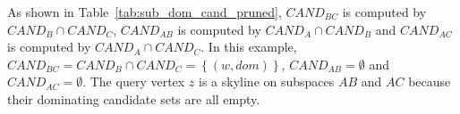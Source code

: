 As shown in Table~\ref{tab:sub_dom_cand_pruned}, $\mathit{CAND}_{BC}$ is computed by $\mathit{CAND}_{B} \cap \mathit{CAND}_{C}$, $\mathit{CAND}_{AB}$ is computed by $\mathit{CAND}_{A} \cap \mathit{CAND}_{B}$ and $\mathit{CAND}_{AC}$ is computed by $\mathit{CAND}_{A} \cap \mathit{CAND}_{C}$. In this example, $\mathit{CAND}_{BC} = \mathit{CAND}_B \cap \mathit{CAND}_C = \left\{(w, dom)\right\}$, $\mathit{CAND}_{AB} = \emptyset$ and $\mathit{CAND}_{AC} = \emptyset$.
The query vertex $z$ is a skyline on subspaces $AB$ and $AC$ because their dominating candidate sets are all empty.
